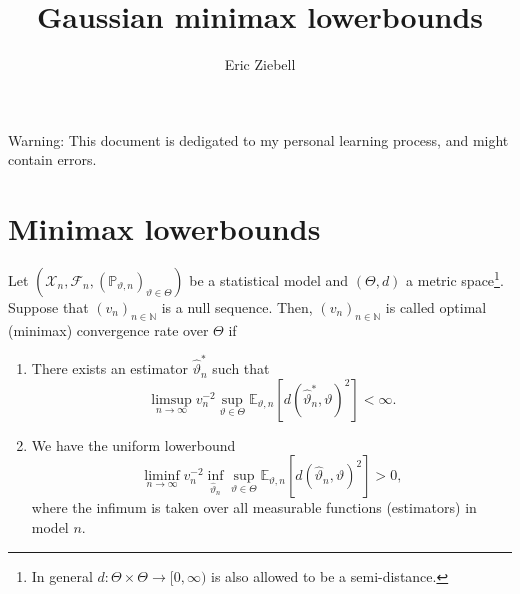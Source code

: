 \documentclass{book}
\author{Eric Ziebell}
\title{Gaussian minimax lowerbounds}
\begin{document}
\maketitle

{\color{red} Warning: This document is dedigated to my personal learning process, and might contain errors.}
\chapter{Minimax lowerbounds}
\begin{definition}
	Let $(\mathcal{X}_n, \mathcal{F}_n, (\mathbb{P}_{\vartheta,n})_{\vartheta \in \Theta})$ be a statistical model and $(\Theta, d)$ a metric space\footnote{In general $d:\Theta \times \Theta \rightarrow [0,\infty)$ is also allowed to be a semi-distance.}. Suppose that $(v_n)_{n \in \mathbb{N}}$ is a null sequence. Then, $(v_n)_{n \in \mathbb{N}}$ is called optimal (minimax) convergence rate over $\Theta$ if
	\begin{enumerate}
		\item There exists an estimator $\hat{\vartheta}_n^{*}$ such that
		      \begin{equation*}
			      \label{condition:upperbound}
			      \limsup_{n \rightarrow \infty} v_n^{-2} \sup_{\vartheta \in \Theta} \mathbb{E}_{\vartheta, n}[d(\hat{\vartheta}_n^{*}, \vartheta)^{2}]< \infty.
		      \end{equation*}
		\item We have the uniform lowerbound
		      \begin{equation*}
			      \liminf_{n \rightarrow \infty} v_n^{-2} \inf_{\hat{\vartheta}_n} \sup_{\vartheta \in \Theta} \mathbb{E}_{\vartheta,n}[d(\hat{\vartheta}_{n}, \vartheta)^{2}]>0,
		      \end{equation*}
		      where the infimum is taken over all measurable functions (estimators) in model $n$.
	\end{enumerate}
\end{definition}
\end{document}
